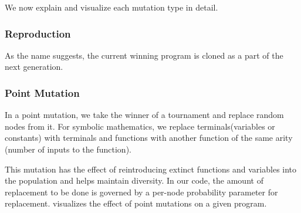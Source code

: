 We now explain and visualize each mutation type in detail.

\subsubsection{Reproduction}
\label{mut:clone}
As the name suggests, the current winning program is cloned as a part of the next generation.
\subsubsection{Point Mutation}
\label{mut:point}
In a point mutation, we take the winner of a tournament and replace random nodes from it. For symbolic mathematics, we replace terminals(variables or constants) with terminals and functions with another function of the same arity (number of inputs to the function).

This mutation has the effect of reintroducing extinct functions and variables into the population and helps maintain diversity\citep{gplearn}. In our code, the amount of replacement to be done is governed by a per-node probability parameter for replacement.  visualizes the effect of point mutations on a given program.

